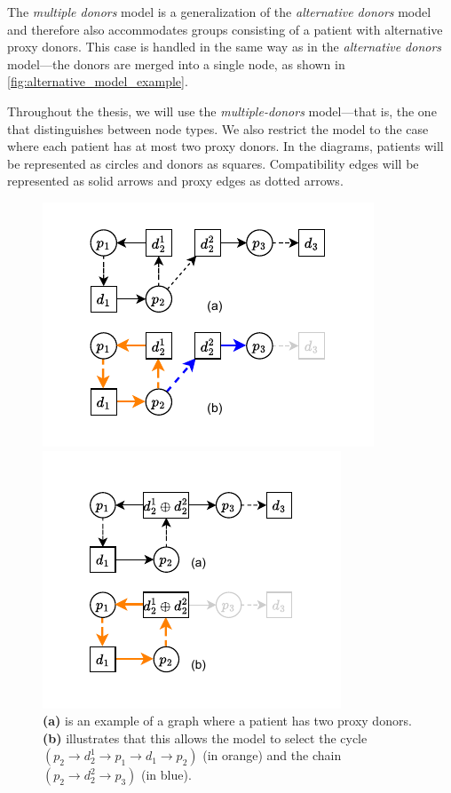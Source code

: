 The \textit{multiple donors} model is a generalization of the \textit{alternative donors} model and therefore also accommodates groups consisting of a patient with alternative proxy donors. This case is handled in the same way as in the \textit{alternative donors} model—the donors are merged into a single node, as shown in \autoref{fig:alternative_model_example}.

Throughout the thesis, we will use the \textit{multiple-donors} model—that is, the one that distinguishes between node types. We also restrict the model to the case where each patient has at most two proxy donors. In the diagrams, patients will be represented as circles and donors as squares. Compatibility edges will be represented as solid arrows and proxy edges as dotted arrows.

\begin{figure}[htbp]
  \centering
  \begin{minipage}[t]{0.48\textwidth}
    \centering
    \includegraphics{data/multiple_model_example.pdf}
    \caption[An example of a graph with a patient having two donors]{\textbf{(a)} is an example of a graph where a patient has two proxy donors. \textbf{(b)} illustrates that this allows the model to select the cycle $(p_2 \rightarrow d_2^1 \rightarrow p_1 \rightarrow d_1 \rightarrow p_2)$ (in orange) and the chain $(p_2 \rightarrow d_2^2 \rightarrow p_3)$ (in blue).}
    \label{fig:multiple_model_example}
  \end{minipage}
  \hfill
  \begin{minipage}[t]{0.48\textwidth}
    \centering
    \includegraphics{data/alternative_model_example.pdf}

\end{minipage}
\end{figure}
